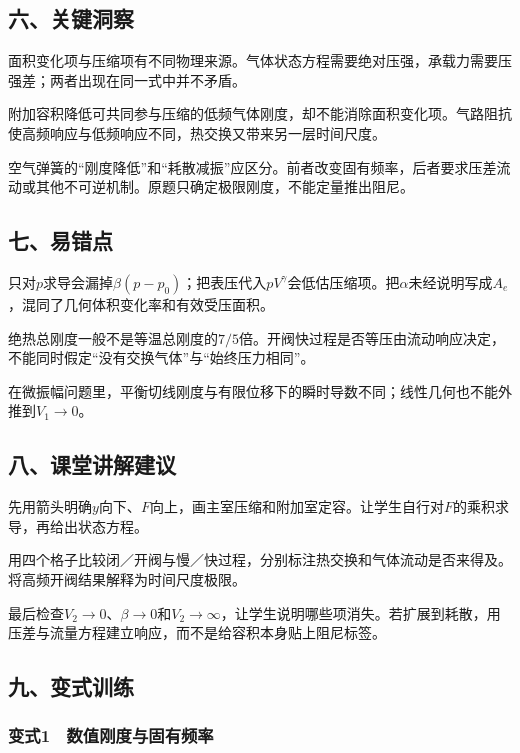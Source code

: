 \documentclass[12pt,a4paper,fontset=fandol]{ctexart}
\begin{document}
\subsection{六、关键洞察}\label{ux516dux5173ux952eux6d1eux5bdf}

面积变化项与压缩项有不同物理来源。气体状态方程需要绝对压强，承载力需要压强差；两者出现在同一式中并不矛盾。

附加容积降低可共同参与压缩的低频气体刚度，却不能消除面积变化项。气路阻抗使高频响应与低频响应不同，热交换又带来另一层时间尺度。

空气弹簧的``刚度降低''和``耗散减振''应区分。前者改变固有频率，后者要求压差流动或其他不可逆机制。原题只确定极限刚度，不能定量推出阻尼。

\subsection{七、易错点}\label{ux4e03ux6613ux9519ux70b9}

只对\(p\)求导会漏掉\(\beta(p-p_0)\)；把表压代入\(pV^\gamma\)会低估压缩项。把\(\alpha\)未经说明写成\(A_e\)，混同了几何体积变化率和有效受压面积。

绝热总刚度一般不是等温总刚度的\(7/5\)倍。开阀快过程是否等压由流动响应决定，不能同时假定``没有交换气体''与``始终压力相同''。

在微振幅问题里，平衡切线刚度与有限位移下的瞬时导数不同；线性几何也不能外推到\(V_1\to0\)。

\subsection{八、课堂讲解建议}\label{ux516bux8bfeux5802ux8bb2ux89e3ux5efaux8bae}

先用箭头明确\(y\)向下、\(F\)向上，画主室压缩和附加室定容。让学生自行对\(F\)的乘积求导，再给出状态方程。

用四个格子比较闭／开阀与慢／快过程，分别标注热交换和气体流动是否来得及。将高频开阀结果解释为时间尺度极限。

最后检查\(V_2\to0\)、\(\beta\to0\)和\(V_2\to\infty\)，让学生说明哪些项消失。若扩展到耗散，用压差与流量方程建立响应，而不是给容积本身贴上阻尼标签。

\subsection{九、变式训练}\label{ux4e5dux53d8ux5f0fux8badux7ec3}

\subsubsection{变式1　数值刚度与固有频率}\label{ux53d8ux5f0f1-ux6570ux503cux521aux5ea6ux4e0eux56faux6709ux9891ux7387}
\end{document}
